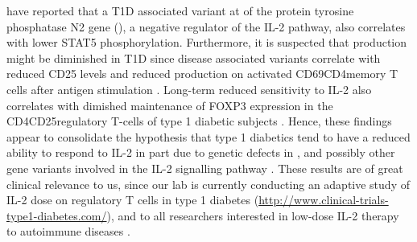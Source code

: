 \citet{Long:2011hk} have reported that a \Gls{T1D} associated variant at 
of the protein tyrosine phosphatase N2 gene (),
a negative regulator of the IL-2 pathway,
also correlates with lower STAT5 phosphorylation.
Furthermore, it is suspected that  production might be diminished in T1D since disease associated  variants 
correlate with reduced CD25 levels 
and reduced  production
on activated CD69\positive CD4\positive memory T cells
after antigen stimulation \citep{Dendrou:2009dv}.
Long-term reduced sensitivity to IL-2 also correlates with dimished maintenance 
of FOXP3 expression in the CD4\positive CD25\positive regulatory T-cells of type 1 diabetic subjects \citep{Long:2010ej}.
Hence, these findings appear to consolidate the hypothesis that type 1 diabetics tend to have a reduced ability to respond to IL-2
in part due to genetic defects in ,  and possibly other gene variants involved in the IL-2 signalling pathway
\citep{Long:2010ej,Long:2011hk,Long:2012ea}.
These results are of great clinical relevance to us,
since our lab is currently conducting an
adaptive study of IL-2 dose on regulatory T cells in type 1 diabetes (\url{http://www.clinical-trials-type1-diabetes.com/}),
and to all researchers interested in low-dose IL-2 therapy to autoimmune diseases \citep{Koreth:2011kv,Saadoun:2011em}.

